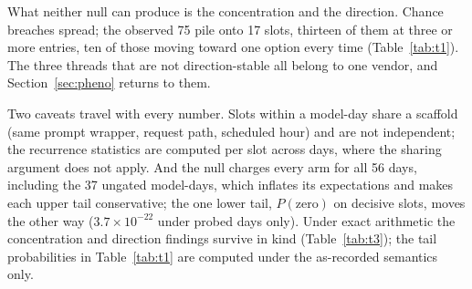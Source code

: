 \documentclass[conference]{IEEEtran}
\begin{document}
What neither null can produce is the concentration and the direction.
Chance breaches spread; the observed 75 pile onto 17 slots, thirteen
of them at three or more entries, ten of those moving toward one
option every time (Table~\ref{tab:t1}). The three threads that are not
direction-stable all belong to one vendor, and Section~\ref{sec:pheno}
returns to them.

Two caveats travel with every number. Slots within a model-day share a
scaffold (same prompt wrapper, request path, scheduled hour) and are
not independent; the recurrence statistics are computed per slot
across days, where the sharing argument does not apply. And the null
charges every arm for all 56 days, including the 37 ungated
model-days, which inflates its expectations and makes each upper tail
conservative; the one lower tail, $P(\text{zero})$ on decisive slots,
moves the other way ($3.7\times10^{-22}$ under probed days only).
Under exact arithmetic the concentration and direction findings
survive in kind (Table~\ref{tab:t3}); the tail probabilities in
Table~\ref{tab:t1} are computed under the as-recorded semantics only.
\end{document}
